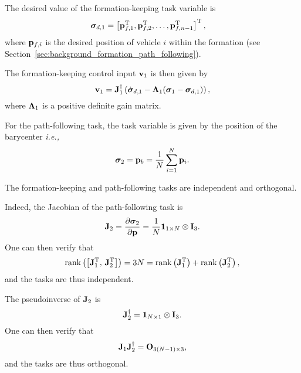 The desired value of the formation-keeping task variable is
\begin{align}
    \bm{\sigma}_{d, 1} &= \left[\mathbf{p}_{f, 1}^{\mathrm{T}}, \mathbf{p}_{f, 2}^{\mathrm{T}}, \ldots, \mathbf{p}_{f, n-1}^{\mathrm{T}}\right]^{\mathrm{T}},
\end{align}
where $\mathbf{p}_{f, i}$ is the desired position of vehicle $i$ within the formation (see Section~\ref{sec:background_formation_path_following}).

The formation-keeping control input $\mathbf{v}_1$ is then given by
\begin{equation}
    \mathbf{v}_1 = \mathbf{J}_1^{\dagger} \left(\dot{\bm{\sigma}}_{d, 1} - \bm{\Lambda}_1 (\bm{\sigma}_1 - \bm{\sigma}_{d, 1})\right),
\end{equation}
where $\bm{\Lambda}_1$ is a positive definite gain matrix.

For the path-following task, the task variable is given by the position of the barycenter \emph{i.e.,}
\begin{equation}
    \bm{\sigma}_2 = \mathbf{p}_b = \frac{1}{N} \sum_{i=1}^{N} \mathbf{p}_i.
\end{equation}

\begin{rmk}
    The formation-keeping and path-following tasks are independent and orthogonal.

    Indeed, the Jacobian of the path-following task is
    \begin{equation}
        \mathbf{J}_2 = \frac{\partial \bm{\sigma}_2}{\partial \mathbf{p}} = \frac{1}{N} \mathbf{1}_{1 \times N} \otimes \mathbf{I}_3.
    \end{equation}
    One can then verify that
    \begin{equation}
        \operatorname*{rank} \left(\left[\mathbf{J}_1^{\mathrm{T}},\, \mathbf{J}_2^{\mathrm{T}}\right]\right) = 3N = \operatorname*{rank} \left(\mathbf{J}_1^{\mathrm{T}}\right) + \operatorname*{rank} \left(\mathbf{J}_2^{\mathrm{T}}\right),
    \end{equation}
    and the tasks are thus independent.

    The pseudoinverse of $\mathbf{J}_2$ is
    \begin{equation}
        \mathbf{J}_2^{\dagger} = \mathbf{1}_{N \times 1} \otimes \mathbf{I}_3.
    \end{equation}
    One can then verify that
    \begin{equation}
        \mathbf{J}_1 \mathbf{J}_2^{\dagger} = \mathbf{O}_{3(N-1) \times 3},
    \end{equation}
    and the tasks are thus orthogonal.
\end{rmk}


